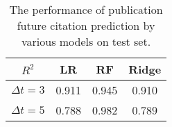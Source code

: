 \begin{table}[ht]
\begin{center}
\begin{tabular}{c|c|c|c}
\hline
$R^2$& LR  & RF & Ridge\\
\hline
\hline
$\Delta t=3$ &0.911 &0.945 &0.910\\
\hline
$\Delta t=5$ & 0.788 & 0.982 &0.789\\
\hline
\end{tabular}
\end{center}
\caption{The performance of publication future citation prediction by various models on test set.}
\label{tbl-pubprediction}

\end{table}